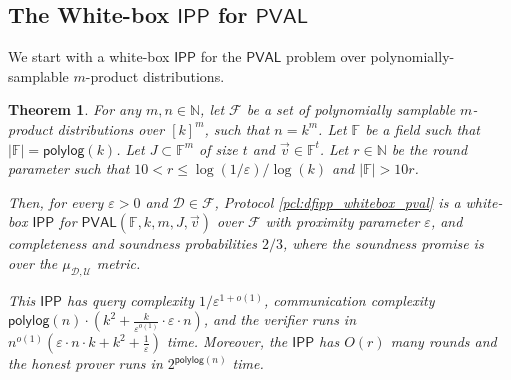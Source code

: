 \documentclass[10pt,a4paper]{article}
\newtheorem{theorem}{Theorem}[section]
\newcommand{\polylog}{\mathsf{polylog}}
\newcommand{\PVAL}{\mathsf{PVAL}}
\newcommand{\IPP}{\mathsf{IPP}}
\newcommand{\F}{\mathbb{F}}
\newcommand{\N}{\mathbb{N}}
\newcommand{\sU}{\mathcal{U}}
\newcommand{\sD}{\mathcal{D}}
\newcommand{\sF}{\mathcal{F}}
\newcommand{\eps}{\varepsilon}
\begin{document}
\subsection{The White-box $\IPP$ for $\PVAL$}
\label{sec:final_wb_ipp_prod}
We start with a white-box $\IPP$ for the $\PVAL$ problem over polynomially-samplable $m$-product distributions.
\begin{theorem}
    \label{thm:wb_dfipp_prod_pval}
    For any $m,n \in \N$, let $\sF$ be a set of polynomially samplable $m$-product distributions over $[k]^m$, such that $n = k^m$. Let $\F$ be a field such that $|\F|=\polylog(k)$. Let $J \subset \F^m$ of size $t$ and $\Vec{v} \in \F^t$. Let $r \in \N$ be the round parameter such that $10 < r \leq \log (1/\varepsilon)/\log (k)$ and $|\F|>10r$. 

    Then, for every $\varepsilon > 0$ and $\sD \in \sF$, Protocol \ref{pcl:dfipp_whitebox_pval} is a white-box $\IPP$ for $\PVAL(\F,k,m,J,\Vec{v})$ over $\sF$ with proximity parameter $\varepsilon$, and completeness and soundness probabilities $2/3$, where the soundness promise is over the $\mu_{\sD,\sU}$ metric. 
    
    This $\IPP$ has query complexity $1/\varepsilon^{1+o(1)}$, communication complexity $\polylog(n) \cdot \left(k^{2}+\frac{k}{\varepsilon^{o(1)}}\cdot \eps \cdot n \right)$, and the verifier runs in $n^{o(1)}(\eps \cdot n \cdot k +k^{2}+ \frac{1}{\varepsilon})$ time. Moreover, the $\IPP$ has $O(r)$ many rounds and the honest prover runs in $2^{\polylog(n)}$ time.
\end{theorem}
\end{document}
